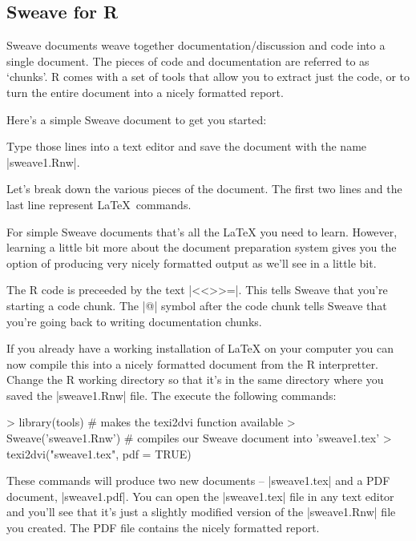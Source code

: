 
\subsection{Sweave for R}

Sweave documents weave together documentation/discussion and code into a
single document. The pieces of code and documentation are referred to as
`chunks'. R comes with a set of tools that allow you to extract just the
code, or to turn the entire document into a nicely formatted report.

Here's a simple Sweave document to get you started:
%
%
Type those lines into a text editor and save the document with the name
|sweave1.Rnw|.

Let's break down the various pieces of the document. The first two lines
and the last line represent LaTeX~commands.

For simple Sweave documents that's all the LaTeX you need to learn.
However, learning a little bit more about the document preparation
system gives you the option of producing very nicely formatted output as
we'll see in a little bit.

The R code is preceeded by the text |<<>>=|. This tells Sweave
that you're starting a code chunk. The |@| symbol after the
code chunk tells Sweave that you're going back to writing documentation
chunks.

If you already have a working installation of LaTeX on your computer you
can now compile this into a nicely formatted document from the R
interpretter. Change the R working directory so that it's in the same
directory where you saved the |sweave1.Rnw| file. The execute
the following commands:
%
\begin{R}
> library(tools)  # makes the texi2dvi function available
> Sweave('sweave1.Rnw') # compiles our Sweave document into 'sweave1.tex'
> texi2dvi("sweave1.tex", pdf = TRUE)
\end{R}
%
These commands will produce two new documents -- |sweave1.tex|
and a PDF document, |sweave1.pdf|. You can open the
|sweave1.tex| file in any text editor and you'll see that it's
just a slightly modified version of the |sweave1.Rnw| file you
created. The PDF file contains the nicely formatted report.

